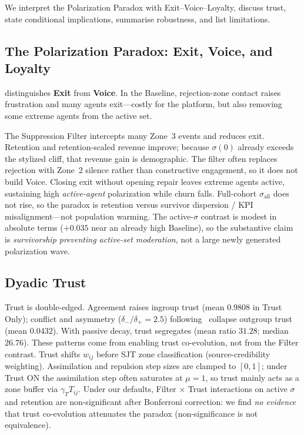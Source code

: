 
We interpret the Polarization Paradox with Exit--Voice--Loyalty, discuss trust, state conditional implications, summarise robustness, and list limitations.

\subsection{The Polarization Paradox: Exit, Voice, and Loyalty}
\citet{Hirschman1970} distinguishes \textbf{Exit} from \textbf{Voice}. In the Baseline, rejection-zone contact raises frustration and many agents exit---costly for the platform, but also removing some extreme agents from the active set.

The Suppression Filter intercepts many Zone~3 events and reduces exit. Retention and retention-scaled revenue improve; because $\sigma(0)$ already exceeds the stylized cliff, that revenue gain is demographic. The filter often replaces rejection with Zone~2 silence rather than constructive engagement, so it does not build Voice. Closing exit without opening repair leaves extreme agents active, sustaining high \emph{active-agent} polarization while churn falls. Full-cohort $\sigma_{\mathrm{all}}$ does not rise, so the paradox is retention versus survivor dispersion / KPI misalignment---not population warming. The active-$\sigma$ contrast is modest in absolute terms ($+0.035$ near an already high Baseline), so the substantive claim is \emph{survivorship preventing active-set moderation}, not a large newly generated polarization wave.

\subsection{Dyadic Trust}
Trust is double-edged. Agreement raises ingroup trust (mean $0.9808$ in Trust Only); conflict and asymmetry ($\delta_-/\delta_+ = 2.5$) following~\citet{Slovic1993} collapse outgroup trust (mean $0.0432$). With passive decay, trust segregates (mean ratio $31.28$; median $26.76$). These patterns come from enabling trust co-evolution, not from the Filter contrast. Trust shifts $w_{ij}$ before SJT zone classification (source-credibility weighting). Assimilation and repulsion step sizes are clamped to $[0,1]$; under Trust ON the assimilation step often saturates at $\mu=1$, so trust mainly acts as a zone buffer via $\gamma_T T_{ij}$. Under our defaults, Filter $\times$ Trust interactions on active $\sigma$ and retention are non-significant after Bonferroni correction: we find \emph{no evidence} that trust co-evolution attenuates the paradox (non-significance is not equivalence).

